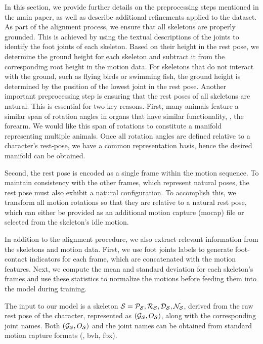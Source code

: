 In this section, we provide further details on the preprocessing steps mentioned in the main paper, as well as describe additional refinements applied to the dataset. 
As part of the alignment process, we ensure that all skeletons are properly grounded. This is achieved by using the textual descriptions of the joints to identify the foot joints of each skeleton. Based on their height in the rest pose, we determine the ground height for each skeleton and subtract it from the corresponding root height in the motion data. For skeletons that do not interact with the ground, such as flying birds or swimming fish, the ground height is determined by the position of the lowest joint in the rest pose.
Another important preprocessing step is ensuring that the rest poses of all skeletons are natural. This is essential for two key reasons. 
First, many animals feature a similar span of rotation angles in organs that have similar functionality, \eg, the forearm. We would like this span of rotations to constitute a manifold representing multiple animals.
Once all rotation angles are defined relative to a character's rest-pose, we have a common representation basis, hence the desired manifold can be obtained.

Second, the rest pose is encoded as a single frame within the motion sequence. To maintain consistency with the other frames, which represent natural poses, the rest pose must also exhibit a natural configuration.
To accomplish this, we transform all motion rotations so that they are relative to a natural rest pose, which can either be provided as an additional motion capture (mocap) file or selected from the skeleton's idle motion.

In addition to the alignment procedure, we also extract relevant information from the skeletons and motion data. First, we use foot joints labels to generate foot-contact indicators for each frame, which are concatenated with the motion features. Next, we compute the mean and standard deviation for each skeleton's frames and use these statistics to normalize the motions before feeding them into the model during training. 

\balance
The input to our model is a skeleton $\mathcal{S} = {\mathcal{P}_{\mathcal{S}}, \mathcal{R}_{\mathcal{S}}, \mathcal{D}_{\mathcal{S}}, \mathcal{N}_{\mathcal{S}}}$, derived from the raw rest pose of the character, represented as $(\mathcal{G}_{\mathcal{S}}, O_{\mathcal{S}})$, along with the corresponding joint names. Both $(\mathcal{G}_{\mathcal{S}}, O_{\mathcal{S}})$ and the joint names can be obtained from standard motion capture formats (\eg, bvh, fbx).

